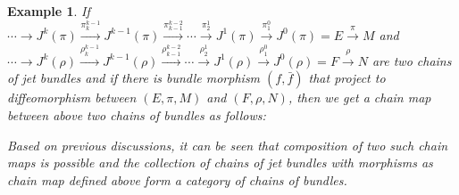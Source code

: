 \documentclass{amsart}
\theoremstyle{plain}
\newtheorem{exam}{Example}
\begin{document}
\begin{exam}
	If $\cdots \rightarrow J^k(\pi) \stackrel{\pi_k^{k-1}}{\rightarrow}
	J^{k-1}(\pi) \stackrel{\pi_{k-1}^{k-2}}{\rightarrow} \cdots \stackrel{\pi_{2}^{1}}{\rightarrow}J^1(\pi) \stackrel{\pi_{1}^{0}}{\rightarrow} J^0(\pi) = E  \stackrel{\pi}{\rightarrow} M $ and $\cdots \rightarrow J^k(\rho) \stackrel{\rho_k^{k-1}}{\rightarrow}
	J^{k-1}(\rho) \stackrel{\rho_{k-1}^{k-2}}{\rightarrow} \cdots \stackrel{\rho_{2}^{1}}{\rightarrow}J^1(\rho) \stackrel{\rho_{1}^{0}}{\rightarrow} J^0(\rho) = F  \stackrel{\rho}{\rightarrow} N $ are two chains of jet bundles and if there is bundle morphism $(f, \bar{f})$ that project to diffeomorphism between $(E, \pi,M)$ and $(F, \rho, N)$, then we get a chain map between  above two chains of bundles as follows:\\
	\begin{center}
	\end{center}  
	Based on previous discussions, it can be seen that composition of two such chain maps is possible and the collection of chains of jet bundles with morphisms as chain map defined above form a category of chains of bundles.\\
\end{exam}
\end{document}
